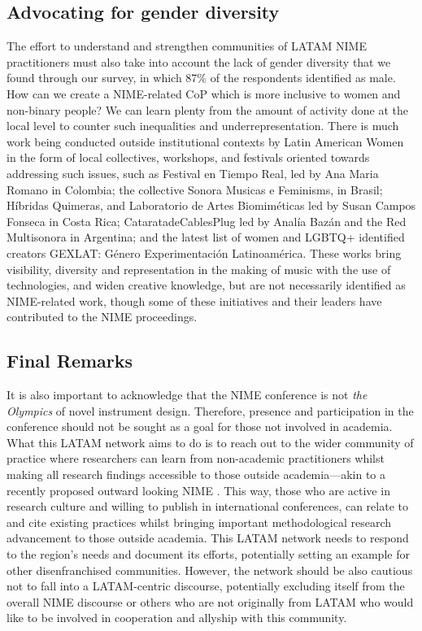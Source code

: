 \documentclass[sigconf]{nimeart}
\begin{document}
\subsection{Advocating for gender diversity}\label{advocating-for-gender-diversity}

The effort to understand and strengthen communities of LATAM NIME practitioners must also take into account the lack of gender diversity that we found through our survey, in which 87\% of the respondents identified as male. How can we create a NIME-related CoP which is more inclusive to women \cite{xambo2018women} and non-binary people? We can learn plenty from the amount of activity done at the local level to counter such inequalities and underrepresentation. There is much work being conducted outside institutional contexts by Latin American Women in the form of local collectives, workshops, and festivals oriented towards addressing such issues, such as Festival en Tiempo Real, led by Ana Maria Romano in Colombia; the collective Sonora Musicas e Feminisms, in Brasil; Híbridas Quimeras, and Laboratorio de Artes Biomiméticas led by Susan Campos Fonseca in Costa Rica; CataratadeCablesPlug led by Analía Bazán and the Red Multisonora in Argentina; and the latest list of women and LGBTQ+ identified creators GEXLAT: Género Experimentación Latinoamérica. These works bring visibility, diversity and representation in the making of music with the use of technologies, and widen creative knowledge, but are not necessarily identified as NIME-related work, though some of these initiatives and their leaders have contributed to the NIME proceedings.

\subsection{Final Remarks}\label{final-remarks}

It is also important to acknowledge that the NIME conference is not \emph{the Olympics} of novel instrument design. Therefore, presence and participation in the conference should not be sought as a goal for those not involved in academia. What this LATAM network aims to do is to reach out to the wider community of practice where researchers can learn from non-academic practitioners whilst making all research findings accessible to those outside academia---akin to a recently proposed outward looking NIME \cite{morreale2020nime}. This way, those who are active in research culture and willing to publish in international conferences, can relate to and cite existing practices whilst bringing important methodological research advancement to those outside academia. This LATAM network needs to respond to the region's needs and document its efforts, potentially setting an example for other disenfranchised communities. However, the network should be also cautious not to fall into a LATAM-centric discourse, potentially excluding itself from the overall NIME discourse or others who are not originally from LATAM who would like to be involved in cooperation and allyship with this community.
\end{document}
